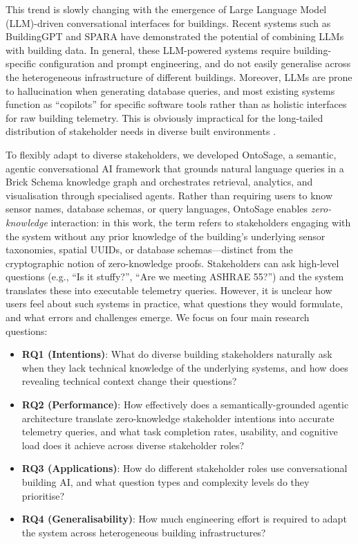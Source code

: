 \documentclass[acmsmall]{acmart}
\begin{document}
This trend is slowly changing with the emergence of Large Language Model (LLM)-driven conversational interfaces for buildings. Recent systems such as BuildingGPT \cite{du2025} and SPARA \cite{Karjou_2025} have demonstrated the potential of combining LLMs with building data. In general, these LLM-powered systems require building-specific configuration and prompt engineering, and do not easily generalise across the heterogeneous infrastructure of different buildings. Moreover, LLMs are prone to hallucination when generating database queries, and most existing systems function as ``copilots'' for specific software tools rather than as holistic interfaces for raw building telemetry. This is obviously impractical for the long-tailed distribution of stakeholder needs in diverse built environments \cite{galanos2023,shi2025}.

To flexibly adapt to diverse stakeholders, we developed OntoSage, a semantic, agentic conversational AI framework that grounds natural language queries in a Brick Schema knowledge graph and orchestrates retrieval, analytics, and visualisation through specialised agents. Rather than requiring users to know sensor names, database schemas, or query languages, OntoSage enables \emph{zero-knowledge} interaction: in this work, the term refers to stakeholders engaging with the system without any prior knowledge of the building's underlying sensor taxonomies, spatial UUIDs, or database schemas---distinct from the cryptographic notion of zero-knowledge proofs. Stakeholders can ask high-level questions (e.g., ``Is it stuffy?'', ``Are we meeting ASHRAE 55?'') and the system translates these into executable telemetry queries. However, it is unclear how users feel about such systems in practice, what questions they would formulate, and what errors and challenges emerge. We focus on four main research questions:

\begin{itemize}
    \item \textbf{RQ1 (Intentions)}: What do diverse building stakeholders naturally ask when they lack technical knowledge of the underlying systems, and how does revealing technical context change their questions?
    \item \textbf{RQ2 (Performance)}: How effectively does a semantically-grounded agentic architecture translate zero-knowledge stakeholder intentions into accurate telemetry queries, and what task completion rates, usability, and cognitive load does it achieve across diverse stakeholder roles?
    \item \textbf{RQ3 (Applications)}: How do different stakeholder roles use conversational building AI, and what question types and complexity levels do they prioritise?
    \item \textbf{RQ4 (Generalisability)}: How much engineering effort is required to adapt the system across heterogeneous building infrastructures?
\end{itemize}
\end{document}
